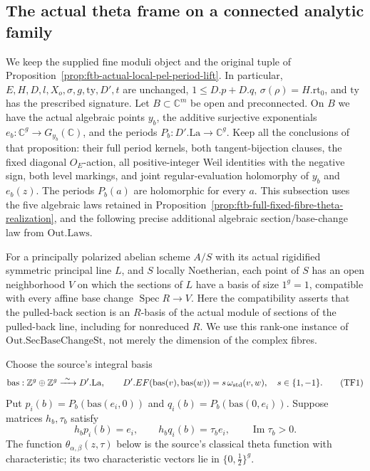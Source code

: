 \subsection{The actual theta frame on a connected analytic family}
\label{subsec:ftb-actual-family-theta-frame}

We keep the supplied fine moduli object and the original tuple of
Proposition~\ref{prop:ftb-actual-local-pel-period-lift}.
In particular, \(E,H,D,l,X_o,\sigma,g,\mathrm{ty},D',t\) are
unchanged, \(1\leq D.p+D.q\), \(\sigma(\rho)=H.\mathrm{rt}_0\),
and \(\mathrm{ty}\) has the prescribed signature.
Let \(B\subset\mathbb C^m\) be open and preconnected.  On \(B\)
we have the actual algebraic points \(y_b\), the additive
surjective exponentials \(e_b:\mathbb C^g\to G_{y_b}(\mathbb C)\),
and the periods \(P_b:D'.\mathrm{La}\to\mathbb C^g\).
Keep all the conclusions of that proposition: their full
period kernels, both tangent-bijection clauses, the fixed
diagonal \(O_E\)-action, all positive-integer Weil identities
with the negative sign, both level markings, and joint
regular-evaluation holomorphy of \(y_b\) and \(e_b(z)\).
The periods \(P_b(a)\) are holomorphic for every \(a\).
This subsection uses the five algebraic laws retained in
Proposition~\ref{prop:ftb-full-fixed-fibre-theta-realization},
and the following precise additional algebraic
section/base-change law from \(\mathrm{Out.Laws}\).

For a principally polarized abelian scheme \(A/S\) with its
actual rigidified symmetric principal line \(L\), and \(S\)
locally Noetherian, each point of \(S\) has an open neighborhood
\(V\) on which the sections of \(L\) have a basis of size
\(1^g=1\), compatible with every affine base change
\(\operatorname{Spec}R\to V\).
Here the compatibility asserts that the pulled-back section
is an \(R\)-basis of the actual module of sections of the
pulled-back line, including for nonreduced \(R\).
We use this rank-one instance of
\(\mathrm{Out.SecBaseChangeSt}\), not merely the dimension of
the complex fibres.

Choose the source's integral basis
\[
 \mathrm{bas}:\mathbb Z^g\oplus\mathbb Z^g
                  \xrightarrow{\ \sim\ }D'.\mathrm{La},
 \qquad
 D'.EF(\mathrm{bas}(v),\mathrm{bas}(w))
                  =s\,\omega_{\rm std}(v,w),\quad s\in\{1,-1\}.
 \tag{TF1}
\]
Put \(p_i(b)=P_b(\mathrm{bas}(e_i,0))\) and
\(q_i(b)=P_b(\mathrm{bas}(0,e_i))\).
Suppose matrices \(h_b,\tau_b\) satisfy
\[
 h_bp_i(b)=e_i,\qquad h_bq_i(b)=\tau_be_i,\qquad
                    \operatorname{Im}\tau_b>0 .
 \tag{TF2}
\]
The function \(\theta_{\alpha,\beta}(z,\tau)\) below is the
source's classical theta function with characteristic;
its two characteristic vectors lie in \(\{0,\tfrac12\}^g\).

